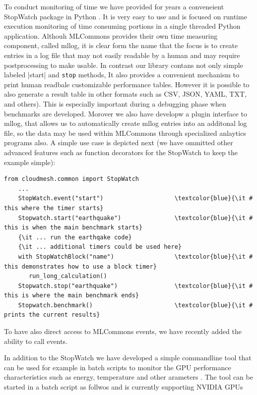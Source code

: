 \documentclass[utf8]{FrontiersinVancouver} %
\begin{document}
To conduct monitoring of time we have provided for years a conveneient
StopWatch package in Python \citep{cloudmesh-stopwatch}.  It is very
easy to use and is focused on runtime execution monitoring of time
consuming portions in a single threaded Python application. Althouh
MLCommons provides their own time measuring component, called mllog,
it is clear form the name that the focus is to create entries in a log
file that may not easily readable by a human and may require
postprocessing to make usable. In contrast our library contans not
only simple labeled \vreb|start| and \verb|stop| methods, It also
provides a convenient mechanism to print human readbale customizable
performance tables. However it is possible to also generate a result
table in other formats such as CSV, JSON, YAML, TXT, and others).
This is especially important during a debugging phase when benchmarks
are developed. Morover we also have developw a plugin interface to
mllog, that allows us to automatically create mllog entries into an
additonal log file, so the data may be used within MLCommons through
specialized anlaytics programs also. A simple use case is depicted
next (we have ommitted other advanced features such as function
decorators for the StopWatch to keep the example simple):

{\footnotesize
\begin{Verbatim}[commandchars=\\\{\}]
    from cloudmesh.common import StopWatch 
    ...
    StopWatch.event("start")                    \textcolor{blue}{\it # this where the timer starts}
    Stopwatch.start("earthquake")               \textcolor{blue}{\it # this is when the main benchmark starts}
    {\it ... run the earthqake code}
    {\it ... additional timers could be used here}
    with StopWatchBlock("name")                 \textcolor{blue}{\it # this demonstrates how to use a block timer}
       run_long_calculation()
    Stopwatch.stop("earthquake")                \textcolor{blue}{\it # this is where the main benchmark ends}
    Stopwatch.benchmark()                       \textcolor{blue}{\it # prints the current results}
\end{Verbatim}
}

To have also direct access to MLCommons events, we have recently added
the ability to call events.


In addition to the StopWatch we have developed a simple commandline
tool that can be used for example in batch scripts to monitor the GPU
performance characteristics such as energy, temperature and other
arameters \citep{cloudmesh-gpu}. The tool can be started in a batch
script as follwos and is currently supporting NVIDIA GPUs
\end{document}
